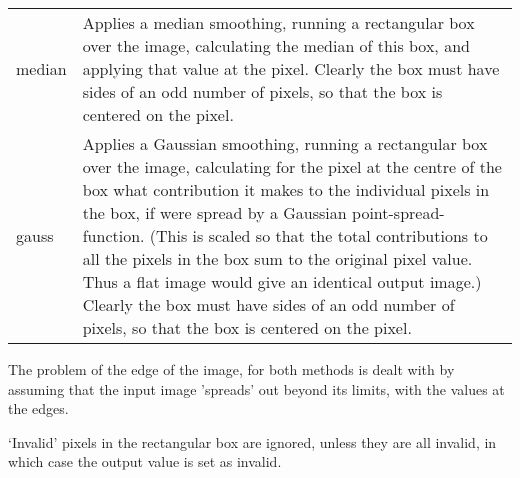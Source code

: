 \begin{small}
{{\begin{tabular}{|l|p{4.0in}|}
   median &  Applies a median smoothing, running a rectangular
           box over the image, calculating the median of this box,
           and applying that value at the pixel. Clearly the box
           must have sides of an odd number of pixels, so that the
           box is centered on the pixel. \\

   gauss &  Applies a Gaussian smoothing, running a rectangular
           box over the image, calculating for the pixel at the centre
           of the box what contribution it makes to the individual
           pixels in the box, if were spread by a Gaussian point-spread-
           function. (This is scaled so that the total contributions
           to all the pixels in the box sum to the original pixel
           value. Thus a flat image would give an identical output image.)
           Clearly the box must have sides of an odd number of pixels, so
           that the box is centered on the pixel. \\
\hline\end{tabular}\vspace*{2mm}

  The problem of the edge of the image, for both methods is dealt with
  by assuming that the input image 'spreads' out beyond its limits, with
  the values at the edges.

  `Invalid' pixels in the rectangular box are ignored, unless they
  are all invalid, in which case the output value is set as invalid.


}}
\end{small}
